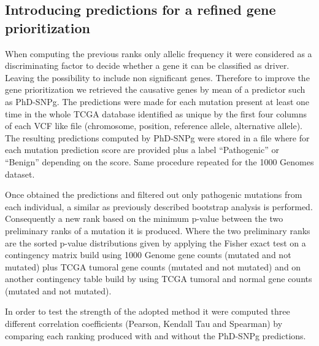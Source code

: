\subsection{Introducing predictions for a refined gene prioritization}
When computing the previous ranks only allelic frequency it were considered as a discriminating factor to decide whether a gene it can be classified as driver. Leaving the possibility to include non significant genes. Therefore to improve the gene prioritization we retrieved the causative genes by mean of a predictor such as PhD-SNPg.  
The predictions were made for each mutation present at least one time in the whole TCGA database identified as unique by the first four columns of each VCF like file (chromosome, position, reference allele, alternative allele). The resulting predictions computed by PhD-SNPg were stored in a file where for each mutation prediction score are provided plus a label “Pathogenic” or “Benign” depending on the score. Same procedure repeated for the 1000 Genomes dataset.


Once obtained the predictions and filtered out only pathogenic mutations from each individual, a similar as previously described bootstrap analysis is performed. 
Consequently a new rank based on the minimum p-value between the two preliminary ranks of a mutation it is produced. Where the two preliminary ranks are the sorted p-value distributions  given by applying the Fisher exact test on a contingency matrix build using 1000 Genome gene counts (mutated and not mutated) plus TCGA tumoral gene counts (mutated and not mutated)  and  on another contingency table build by using TCGA tumoral and normal gene counts (mutated and not mutated).


In order to test the strength of the adopted method it were computed three different correlation coefficients (Pearson, Kendall Tau and Spearman) by comparing each ranking produced with and without the PhD-SNPg predictions.


